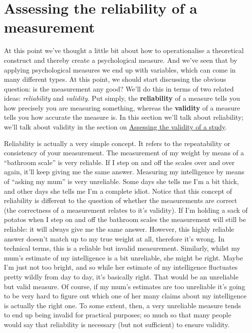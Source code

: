\documentclass[
  a4paper,
]{book}
\begin{document}
\hypertarget{sec-Assessing-the-reliability-of-a-measurement}{%
\section{Assessing the reliability of a
measurement}\label{sec-Assessing-the-reliability-of-a-measurement}}

At this point we've thought a little bit about how to operationalise a
theoretical construct and thereby create a psychological measure. And
we've seen that by applying psychological measures we end up with
variables, which can come in many different types. At this point, we
should start discussing the obvious question: is the measurement any
good? We'll do this in terms of two related ideas: \emph{reliability}
and \emph{validity}. Put simply, the \textbf{reliability} of a measure
tells you how precisely you are measuring something, whereas the
\textbf{validity} of a measure tells you how accurate the measure is. In
this section we'll talk about reliability; we'll talk about validity in
the section on
\protect\hyperlink{assessing-the-validity-of-a-study}{Assessing the
validity of a study}.

Reliability is actually a very simple concept. It refers to the
repeatability or consistency of your measurement. The measurement of my
weight by means of a ``bathroom scale'' is very reliable. If I step on
and off the scales over and over again, it'll keep giving me the same
answer. Measuring my intelligence by means of ``asking my mum'' is very
unreliable. Some days she tells me I'm a bit thick, and other days she
tells me I'm a complete idiot. Notice that this concept of reliability
is different to the question of whether the measurements are correct
(the correctness of a measurement relates to it's validity). If I'm
holding a sack of potatos when I step on and off the bathroom scales the
measurement will still be reliable: it will always give me the same
answer. However, this highly reliable answer doesn't match up to my true
weight at all, therefore it's wrong. In technical terms, this is a
reliable but invalid measurement. Similarly, whilst my mum's estimate of
my intelligence is a bit unreliable, she might be right. Maybe I'm just
not too bright, and so while her estimate of my intelligence fluctuates
pretty wildly from day to day, it's basically right. That would be an
unreliable but valid measure. Of course, if my mum's estimates are too
unreliable it's going to be very hard to figure out which one of her
many claims about my intelligence is actually the right one. To some
extent, then, a very unreliable measure tends to end up being invalid
for practical purposes; so much so that many people would say that
reliability is necessary (but not sufficient) to ensure validity.
\end{document}
